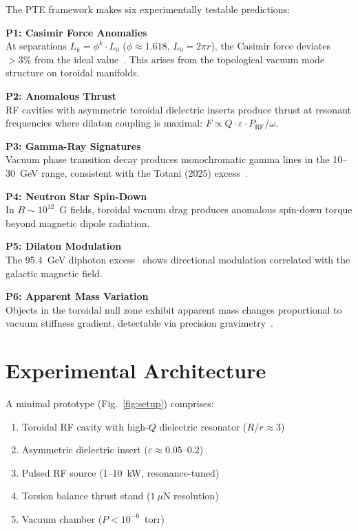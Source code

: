 \documentclass[preprint,12pt]{elsarticle}
\begin{document}
The PTE framework makes six experimentally testable predictions:

\textbf{P1: Casimir Force Anomalies}\\
At separations $L_k = \phi^k \cdot L_0$ ($\phi\approx1.618$, $L_0=2\pi r$), the Casimir force deviates $>3\%$ from the ideal value~\cite{zero2025,capasso}. This arises from the topological vacuum mode structure on toroidal manifolds.

\textbf{P2: Anomalous Thrust}\\
RF cavities with asymmetric toroidal dielectric inserts produce thrust at resonant frequencies where dilaton coupling is maximal: $F \propto Q \cdot \varepsilon \cdot P_{\text{RF}} / \omega$.

\textbf{P3: Gamma-Ray Signatures}\\
Vacuum phase transition decay produces monochromatic gamma lines in the 10--30~GeV range, consistent with the Totani (2025) excess~\cite{totani2025}.

\textbf{P4: Neutron Star Spin-Down}\\
In $B\sim10^{12}$~G fields, toroidal vacuum drag produces anomalous spin-down torque beyond magnetic dipole radiation.

\textbf{P5: Dilaton Modulation}\\
The 95.4~GeV diphoton excess~\cite{atlascms2025} shows directional modulation correlated with the galactic magnetic field.

\textbf{P6: Apparent Mass Variation}\\
Objects in the toroidal null zone exhibit apparent mass changes proportional to vacuum stiffness gradient, detectable via precision gravimetry~\cite{woodward1990}.

\section{Experimental Architecture}
\label{sec:experiment}

A minimal prototype (Fig.~\ref{fig:setup}) comprises:

\begin{enumerate}
    \item Toroidal RF cavity with high-$Q$ dielectric resonator ($R/r\approx3$)
    \item Asymmetric dielectric insert ($\varepsilon\approx0.05$--$0.2$)
    \item Pulsed RF source (1--10~kW, resonance-tuned)
    \item Torsion balance thrust stand ($1~\mu$N resolution)
    \item Vacuum chamber ($P<10^{-6}$~torr)
\end{enumerate}
\end{document}
